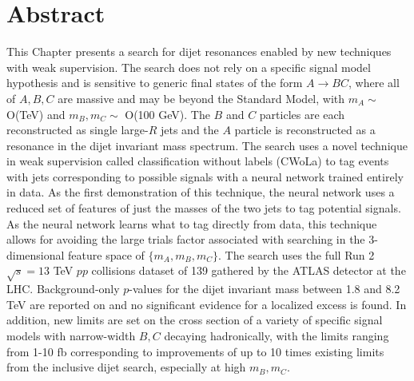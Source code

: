 \section{Abstract}
This Chapter presents a search for dijet resonances enabled by new techniques with weak supervision.
The search does not rely on a specific signal model hypothesis and is sensitive to generic final states of the form $A\rightarrow BC$, where all of $A,B,C$ are massive and may be beyond the Standard Model, with $m_A\sim$ O(TeV) and $m_B,m_C\sim$ O(100 GeV).
The $B$ and $C$ particles are each reconstructed as single large-$R$ jets and the $A$ particle is reconstructed as a resonance in the dijet invariant mass spectrum.
The search uses a novel technique in weak supervision called classification without labels (CWoLa) to tag events with jets corresponding to possible signals with a neural network trained entirely in data.
As the first demonstration of this technique, the neural network uses a reduced set of features of just the masses of the two jets to tag potential signals.
As the neural network learns what to tag directly from data, this technique allows for avoiding the large trials factor associated with searching in the 3-dimensional feature space of $\{m_A,m_B,m_C\}$.
The search uses the full Run 2 $\sqrt{s}=13$ TeV $pp$ collisions dataset of 139\ifb{} gathered by the ATLAS detector at the LHC.
Background-only $p$-values for the dijet invariant mass between 1.8 and 8.2 TeV are reported on and no significant evidence for a localized excess is found.
In addition, new limits are set on the cross section of a variety of specific signal models with narrow-width $B,C$ decaying hadronically, with the limits ranging from 1-10 fb corresponding to improvements of up to 10 times existing limits from the inclusive dijet search, especially at high $m_B,m_C$.

